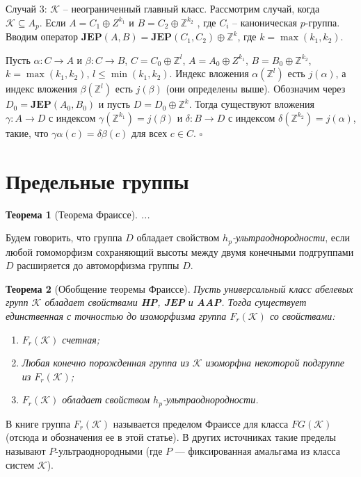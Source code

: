 \documentclass[12pt]{extarticle} %
\newtheorem{theorem}{Теорема}[section]
\def\proof{{\noindent{\bf Доказательство.}} }
\def\K{{\mathcal{K}}}
\def\Z{{\mathbb{Z}}}
\def\HP{\textbf{HP}}
\def\JEP{\textbf{JEP}}
\def\AAP{\textbf{AAP}}
\begin{document}
Случай 3: $\K$ -- неограниченный главный класс. Рассмотрим случай, когда $\K \subseteq A_p$. Если $A = C_1 \oplus Z^{k_1}$ и $B = C_2 \oplus \Z^{k_2}$ , где $C_i$ -- каноническая $p$-группа. Вводим оператор $\JEP(A, B) = \JEP(C_1, C_2) \oplus \Z^k$, где $k = \max(k_1, k_2)$.

Пусть $\alpha: C \rightarrow A$ и $\beta: C \rightarrow B$, $C = C_0 \oplus \Z^l$, $A = A_0 \oplus Z^{k_1}$, $B = B_0 \oplus \Z^{k_2}$, $k = \max(k_1, k_2)$, $l \leq \min(k_1, k_2)$. Индекс вложения $\alpha(\Z^l)$ есть $j(\alpha)$, а индекс вложения $\beta(\Z^l)$ есть $j(\beta)$ (они определены выше). Обозначим через $D_0 = \JEP(A_0, B_0)$ и пусть $D = D_0 \oplus \Z^k$. Тогда существуют вложения $\gamma: A \rightarrow D$ с индексом $\gamma(\Z^{k_1}) = j(\beta)$ и $\delta: B \rightarrow D$ с индексом $\delta(\Z^{k_2}) = j(\alpha)$, такие, что $\gamma\alpha(c) = \delta\beta(c)$ для всех $c \in C$. $\square$


\section{Предельные группы}

\begin{theorem}[Теорема Фраиссе]
...
\end{theorem}

Будем говорить, что группа $D$ обладает свойством \textit{$h_p$-ультраоднородности}, если любой гомоморфизм сохраняющий высоты между двумя конечными подгруппами $D$ расширяется до автоморфизма группы $D$.

\begin{theorem}[Обобщение теоремы Фраиссе]\label{th:Fraisse}
Пусть универсальный класс абелевых групп $\K$ обладает свойствами \HP, \JEP{} и \AAP. Тогда существует единственная с точностью до изоморфизма группа $F_r(\K)$ со свойствами:
\begin{enumerate}
\item $F_r(\K)$ счетная;
\item Любая конечно порожденная группа из $\K$ изоморфна некоторой подгруппе из $F_r(\K)$;
\item $F_r(\K)$ обладает свойством $h_p$-ультраоднородности.
\end{enumerate}
\end{theorem}

\proof {}

В книге \cite{Hodges} группа $F_r(\K)$ называется пределом Фраиссе для класса $FG(\K)$ (отсюда и обозначения ее в этой статье). В других источниках такие пределы называют $P$-ультраоднородными (где $P$ --- фиксированная амальгама из класса систем $\K$).
\end{document}

